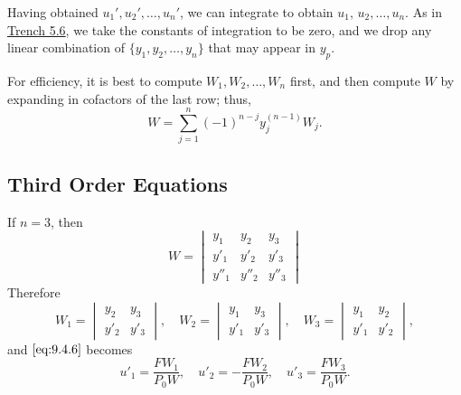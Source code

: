 \documentclass{ximera}
\begin{document}
Having obtained $u_1', u_2', \dots, u_n'$, we can integrate  to
obtain $u_1,\,u_2,\dots,u_n$. As in \href{https://xerxes.ximera.org/differentialequations/main/variationOfParameters/variationOfParameters}{Trench 5.6}, we
take the constants
of integration to be zero, and we drop any linear combination of
$\{y_1,y_2,\dots,y_n\}$ that may appear in $y_p$.


\begin{remark}
For efficiency, it is best to compute $W_1, W_2, \dots, W_n$
first, and then compute $W$ by expanding in cofactors of the last row;
thus,
$$
W=\sum_{j=1}^n(-1)^{n-j}y_j^{(n-1)}W_j.
$$
\end{remark}



\subsection*{Third Order Equations}

If $n=3$, then
$$
W=\begin{vmatrix}
y_1&y_2&y_3 \\
y'_1&y'_2&y'_3 \\
y''_1&y''_2&y''_3 \end{vmatrix}
$$
Therefore
$$
W_1=\begin{vmatrix}
y_2&y_3 \\
y'_2&y'_3 \end{vmatrix},
\quad W_2=\begin{vmatrix}
y_1&y_3 \\
 y'_1&y'_3 \end{vmatrix},
\quad W_3=\begin{vmatrix}
y_1&y_2 \\
y'_1&y'_2 \end{vmatrix},
$$
and $\eqref{eq:9.4.6}$  becomes
\begin{equation} \label{eq:9.4.7}
u'_1=\frac{FW_1}{P_0W},\quad u'_2=-\frac{FW_2}{P_0W},\quad
u'_3=\frac{FW_3}{P_0W}.
\end{equation}
\end{document}
